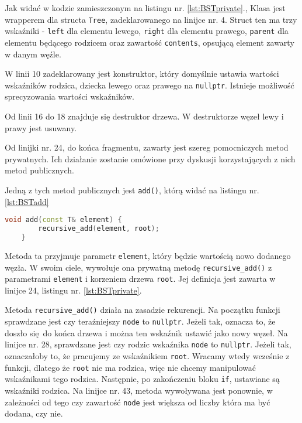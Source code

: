 Jak widać w kodzie zamieszczonym na listingu nr. \ref{lst:BSTprivate}., Klasa jest wrapperem dla structa \texttt{Tree}, zadeklarowanego na linijce nr. 4. Struct ten ma trzy wskaźniki - \texttt{left} dla elementu lewego, \texttt{right} dla elementu prawego, \texttt{parent} dla elementu będącego rodzicem oraz zawartość \texttt{contents}, opsującą element zawarty w danym węźle. 

W linii 10 zadeklarowany jest konstruktor, który domyślnie ustawia wartości wskaźników rodzica, dziecka lewego oraz prawego na \texttt{nullptr}. Istnieje możliwość sprecyzowania wartości wskaźników.

Od linii 16 do 18 znajduje się destruktor drzewa. W destruktorze węzeł lewy i prawy jest usuwany.

Od linijki nr. 24, do końca fragmentu, zawarty jest szereg pomocniczych metod prywatnych. Ich działanie zostanie omówione przy dyskusji korzystających z nich metod publicznych.

Jedną z tych metod publicznych jest \texttt{add()}, którą widać na listingu nr. \ref{lst:BSTadd}

\begin{lstlisting}[caption=Metoda \texttt{add()}, label={lst:BSTadd}, language=C++]
	void add(const T& element) {
		recursive_add(element, root);
	}

\end{lstlisting}

Metoda ta przyjmuje parametr \texttt{element}, który będzie wartością nowo dodanego węzła. W swoim ciele, wywołuje ona prywatną metodę \texttt{recursive\_add()} z parametrami \texttt{element} i korzeniem drzewa \texttt{root}. Jej definicja jest zawarta w linijce 24, listingu nr. \ref{lst:BSTprivate}. 

Metoda \texttt{recursive\_add()} działa na zasadzie rekurencji. Na początku funkcji sprawdzane jest czy teraźniejszy \texttt{node} to \texttt{nullptr}. Jeżeli tak, oznacza to, że doszło się do końca drzewa i można ten wskaźnik ustawić jako nowy węzeł. Na linijce nr. 28, sprawdzane jest czy rodzic wskaźnika \texttt{node} to \texttt{nullptr}. Jeżeli tak, oznaczałoby to, że pracujemy ze wskaźnikiem \texttt{root}. Wracamy wtedy wcześnie z funkcji, dlatego że \texttt{root} nie ma rodzica, więc nie chcemy manipulować wskaźnikami tego rodzica. Następnie, po zakończeniu bloku \texttt{if}, ustawiane są wskaźniki rodzica. Na linijce nr. 43, metoda wywoływana jest ponownie, w zależności od tego czy zawartość \texttt{node} jest większa od liczby która ma być dodana, czy nie.

